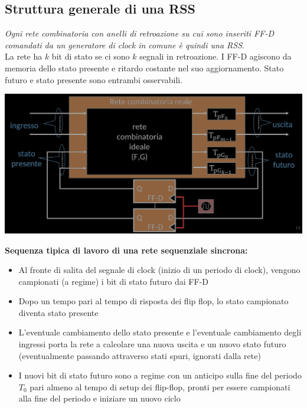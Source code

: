 \documentclass{article}
\begin{document}
\subsection{Struttura generale di una RSS}
\textit{Ogni rete combinatoria con anelli di retroazione su cui sono inseriti FF-D comandati da un generatore di clock in comune è quindi una RSS}.\\
La rete ha $k$ bit di stato se ci sono $k$ segnali in retroazione. I FF-D agiscono da memoria dello stato presente e ritardo costante nel suo aggiornamento. Stato futuro e stato presente sono entrambi osservabili.
\begin{center}
    \includegraphics[scale=0.35]{RSS.png}
\end{center}
\textbf{Sequenza tipica di lavoro di una rete sequenziale {\color{blue} sincrona}:}
\begin{itemize}
    \item Al fronte di salita del segnale di clock (inizio di un periodo di clock), vengono campionati (a regime) i bit di stato futuro dai FF-D
    \item Dopo un tempo pari al tempo di risposta dei flip flop, lo stato campionato diventa stato presente
    \item L’eventuale cambiamento dello stato presente e l’eventuale cambiamento degli ingressi porta la rete a calcolare una nuova uscita e un nuovo stato futuro (eventualmente passando attraverso stati spuri, ignorati dalla rete)
    \item I nuovi bit di stato futuro sono a regime con un anticipo sulla fine del periodo $T_0$ pari almeno al tempo di setup dei flip-flop, pronti per essere campionati alla fine del periodo e iniziare un nuovo ciclo
\end{itemize}
\end{document}

